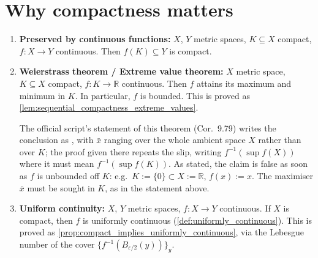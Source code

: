 
\section{Why compactness matters}
\label{sec:why_compactness_matters}

\begin{enumerate}[label=\textbf{(\alph*)}]
  \item \label{item:continuity_preserves_compact}
    \textbf{Preserved by continuous functions:} $X$, $Y$ metric spaces, $K \subseteq X$
    compact, $f : X \to Y$ continuous. Then $f(K) \subseteq Y$ is compact.
  \item \label{item:extreme_value_theorem}
    \textbf{Weierstrass theorem / Extreme value theorem:} $X$ metric space,
    $K \subseteq X$ compact, $f : K \to \mathbb{R}$ continuous. Then $f$ attains its maximum and
    minimum in $K$. In particular, $f$ is bounded. This is proved as
    \cref{lem:sequential_compactness_extreme_values}.
    \begin{ainote}
    The official script's statement of this theorem (Cor.\ 9.79) writes the conclusion as
    , with $\bar x$ ranging over
    the whole ambient space $X$ rather than over $K$; the proof given there repeats the slip,
    writing $f^{-1}(\sup f(X))$ where it must mean $f^{-1}(\sup f(K))$. As stated, the claim is
    false as soon as $f$ is unbounded off $K$: e.g.\ $K:=\{0\}\subset X:=\mathbb{R}$,
    $f(x):=x$. The maximiser $\bar x$ must be sought in $K$, as in the statement above.
    \end{ainote}
  \item \label{item:uniform_continuity_compact}
    \textbf{Uniform continuity:} $X$, $Y$ metric spaces, $f : X \to Y$ continuous. If $X$ is
    compact, then $f$ is uniformly continuous (\cref{def:uniformly_continuous}). This is proved
    as \cref{prop:compact_implies_uniformly_continuous}, via the Lebesgue number of the cover
    $\{f^{-1}(B_{\varepsilon/2}(y))\}_{y}$.
\end{enumerate}

